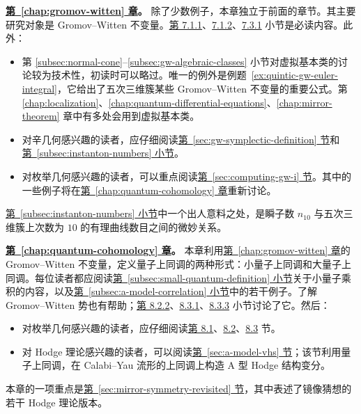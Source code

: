 \noindent\textbf{\hyperref[chap:gromov-witten]{第~\ref*{chap:gromov-witten} 章}。} 除了少数例子，本章独立于前面的章节。其主要研究对象是 Gromov--Witten 不变量。\hyperref[subsec:stable-maps]{第 7.1.1}、\hyperref[subsec:moduli-to-gw]{7.1.2}、\hyperref[subsec:gw-axioms]{7.3.1} 小节是必读内容。此外：
\begin{itemize}
\item 第 \hyperref[subsec:normal-cone]{\ref*{subsec:normal-cone}}--\hyperref[subsec:gw-algebraic-classes]{\ref*{subsec:gw-algebraic-classes}} 小节对虚拟基本类的讨论较为技术性，初读时可以略过。唯一的例外是例题~\ref{ex:quintic-gw-euler-integral}，它给出了五次三维簇某些 Gromov--Witten 不变量的重要公式。第 \hyperref[chap:localization]{\ref*{chap:localization}}、\hyperref[chap:quantum-differential-equations]{\ref*{chap:quantum-differential-equations}}、\hyperref[chap:mirror-theorem]{\ref*{chap:mirror-theorem}} 章中有多处会用到虚拟基本类。
\item 对辛几何感兴趣的读者，应仔细阅读\hyperref[sec:gw-symplectic-definition]{第~\ref*{sec:gw-symplectic-definition} 节}和\hyperref[subsec:instanton-numbers]{第~\ref*{subsec:instanton-numbers} 小节}。
\item 对枚举几何感兴趣的读者，可以重点阅读\hyperref[sec:computing-gw-i]{第~\ref*{sec:computing-gw-i} 节}。其中的一些例子将在\hyperref[chap:quantum-cohomology]{第~\ref*{chap:quantum-cohomology} 章}重新讨论。
\end{itemize}
\hyperref[subsec:instanton-numbers]{第~\ref*{subsec:instanton-numbers} 小节}中一个出人意料之处，是瞬子数 $n_{10}$ 与五次三维簇上次数为 $10$ 的有理曲线数目之间的微妙关系。

\noindent\textbf{\hyperref[chap:quantum-cohomology]{第~\ref*{chap:quantum-cohomology} 章}。} 本章利用\hyperref[chap:gromov-witten]{第~\ref*{chap:gromov-witten} 章}的 Gromov--Witten 不变量，定义量子上同调的两种形式：小量子上同调和大量子上同调。每位读者都应阅读\hyperref[subsec:small-quantum-definition]{第~\ref*{subsec:small-quantum-definition} 小节}关于小量子乘积的内容，以及\hyperref[subsec:a-model-correlation]{第~\ref*{subsec:a-model-correlation} 小节}中的若干例子。了解 Gromov--Witten 势也有帮助；\hyperref[subsec:gw-potential]{第 8.2.2}、\hyperref[subsec:gw-potential-structure]{8.3.1}、\hyperref[subsec:quintic-gw-potential]{8.3.3} 小节讨论了它。然后：
\begin{itemize}
\item 对枚举几何感兴趣的读者，应仔细阅读\hyperref[sec:small-quantum-cohomology]{第 8.1}、\hyperref[sec:big-quantum-cohomology]{8.2}、\hyperref[sec:computing-gw-ii]{8.3} 节。
\item 对 Hodge 理论感兴趣的读者，可以阅读\hyperref[sec:a-model-vhs]{第~\ref*{sec:a-model-vhs} 节}；该节利用量子上同调，在 Calabi--Yau 流形的上同调上构造 A 型 Hodge 结构变分。
\end{itemize}
本章的一项重点是\hyperref[sec:mirror-symmetry-revisited]{第~\ref*{sec:mirror-symmetry-revisited} 节}，其中表述了镜像猜想的若干 Hodge 理论版本。

